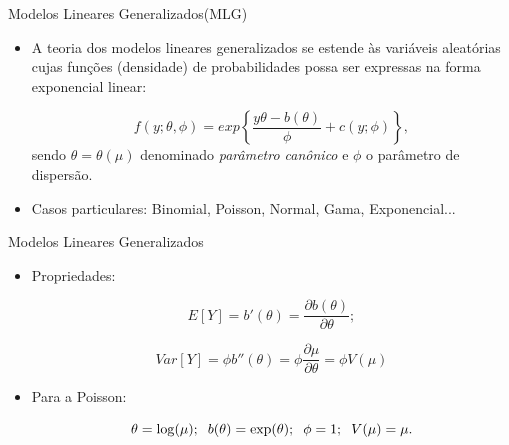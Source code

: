 \documentclass[10pt, aspectratio=169]{beamer}
\begin{document}





\begin{frame}{Modelos Lineares Generalizados(MLG)} 

\begin{itemize}

\item A teoria dos modelos lineares generalizados se estende às variáveis aleatórias cujas funções (densidade) de probabilidades possa ser expressas na forma exponencial linear:

  \vspace{0,5cm}  

$$
    f\left ( y;\theta,\phi \right) =exp\left \{ \frac{y\theta-b\left ( \theta \right )}{\phi}+c\left ( y;\phi \right ) \right \},
$$
  \vspace{0,5cm}  
sendo $\theta=\theta(\mu)$ denominado \textit{parâmetro canônico} e $\phi$ o parâmetro de dispersão.

  \vspace{0,5cm}  

\item Casos particulares: Binomial, Poisson, Normal, Gama, Exponencial...

\end{itemize}
\end{frame}



\begin{frame}{Modelos Lineares Generalizados} 
\begin{itemize}

\item Propriedades:

$$
    E[Y]=b'(\theta)=\frac{\partial b(\theta)}{\partial \theta};
$$ 

$$   
    Var[Y]=\phi b''(\theta)=\phi\frac{\partial \mu}{\partial \theta}=\phi V(\mu)
$$


\item Para a Poisson:

$$\theta = \log(\mu); \hspace{0.2cm} b(\theta)=\exp(\theta); \hspace{0.2cm} \phi=1; \hspace{0.2cm} V(\mu)=\mu.$$

\end{itemize}
\end{frame}
\end{document}
